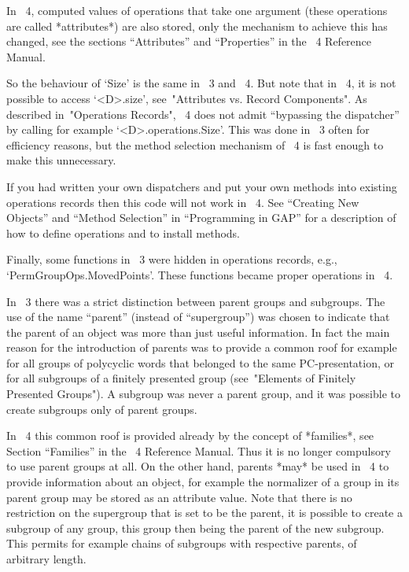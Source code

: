 In {\GAP}~4, computed values of operations that take one argument
(these operations are called *attributes*) are also stored, only the
mechanism to achieve this has changed, see the sections ``Attributes''
and ``Properties'' in the {\GAP}~4 Reference Manual.

So the behaviour of `Size' is the same in {\GAP}~3 and {\GAP}~4.  But
note that in {\GAP}~4, it is not possible to access `<D>.size',
see~"Attributes vs. Record Components".  As described in~"Operations
Records", {\GAP}~4 does not admit ``bypassing the dispatcher'' by
calling for example `<D>.operations.Size'.  This was done in {\GAP}~3
often for efficiency reasons, but the method selection mechanism of
{\GAP}~4 is fast enough to make this unnecessary.

If you had written your own dispatchers and put your own methods into
existing operations records then this code will not work in {\GAP}~4.
See ``Creating New Objects'' and ``Method Selection'' in
``Programming in GAP'' for a description of how to define operations
and to install methods.

Finally, some functions in {\GAP}~3 were hidden in
operations records, e.g., `PermGroupOps.MovedPoints'.
These functions became proper operations in {\GAP}~4.



In {\GAP}~3 there was a strict distinction between parent groups and
subgroups.
The use of the name ``parent'' (instead of ``supergroup'')
was chosen to indicate that the parent of an object was more than just
useful information.
In fact the main reason for the introduction of parents was to provide
a common roof for example for all groups of polycyclic words that
belonged to the same PC-presentation, or for all subgroups of a finitely
presented group (see~"Elements of Finitely Presented Groups").
A subgroup was never a parent group, and it was possible to create
subgroups only of parent groups.

In {\GAP}~4 this common roof is provided already by the concept of
*families*, see Section ``Families'' in the {\GAP}~4 Reference Manual.
Thus it is no longer compulsory to use parent groups at all.
On the other hand, parents *may* be used in {\GAP}~4 to provide
information about an object, for example the normalizer of a group in its
parent group may be stored as an attribute value.
Note that there is no restriction on the supergroup that is set to be
the parent,
it is possible to create a subgroup of
any group, this group then being the parent of the new subgroup.
This permits for example chains of subgroups with respective parents,
of arbitrary length.

